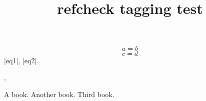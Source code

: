 \documentclass{article}
\title{refcheck tagging test}
\begin{document}
\begin{equation} \label{eq1}
a=b
\end{equation}
\begin{equation} \label{eq2}
c=d
\end{equation}
\eqref{eq1}, \eqref{eq2}.

\cite{book1}, \cite{book3}

\begin{thebibliography}{9}
A book.
Another book.
Third book.
\end{thebibliography}
\end{document}
